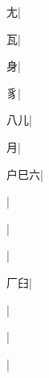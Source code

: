 \begin{multicols}{2}
{{\cjk{}{\cnsym{}　}{\cnsym{}　}尢}|{}\par
{\cjk{}{\cnsym{}　}{\cnsym{}　}瓦}|{}\par
{\cjk{}{\cnsym{}　}{\cnsym{}　}身}|{}\par
{\cjk{}{\cnsym{}　}{\cnsym{}　}豸}|{}\par
{\cjk{}{\cnsym{}　}八儿}|{}\par
{\cjk{}{\cnsym{}　}{\cnsym{}　}月}|{}\par
{\cjk{}户巳六}|{}\par
{}|{}\par
{}|{}\par
{\cjk{}{\cnsym{}　}{\cnsym{}　}{\cnsym{}　}}|{}\par
{厂{\cnxb{}𦥑}}|{}\par
{\cjk{}{\cnsym{}　}{\cnsym{}　}{\cnsym{}　}}|{}\par
{}|{}\par
{\cjk{}{\cnsym{}　}{\cnsym{}　}{\cnsym{}　}}|{}\par
}
\end{multicols}
